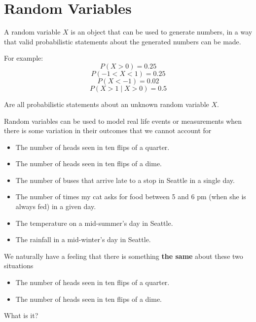 \section{Random Variables}

\begin{frame}
A random variable $X$ is an object that can be used to generate numbers, in a way that valid probabilistic statements about the generated numbers can be made. 

\hfill

For example:
$$ P(X > 0) = 0.25 $$
$$ P(-1 < X < 1) = 0.25 $$
$$ P(X < -1) = 0.02 $$
$$ P(X > 1 \mid X > 0) = 0.5 $$

Are all probabilistic statements about an unknown random variable $X$.
\end{frame}
%

%
\begin{frame}
Random variables can be used to model real life events or measurements when
there is some variation in their outcomes that we cannot account for

\begin{itemize}
\item The number of heads seen in ten flips of a quarter.
\item The number of heads seen in ten flips of a dime.
\item The number of buses that arrive late to a stop in Seattle in a single
day.
\item The number of times my cat asks for food between 5 and 6 pm (when she is
always fed) in a given day.
\item The temperature on a mid-summer's day in Seattle.
\item The rainfall in a mid-winter's day in Seattle.
\end{itemize}

\end{frame}
%

%
\begin{frame}
We naturally have a feeling that there is something \textbf{the same} about
these two situations

\begin{itemize}
\item The number of heads seen in ten flips of a quarter.
\item The number of heads seen in ten flips of a dime.
\end{itemize}

What is it?
\end{frame}
%

